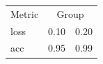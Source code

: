 \begin{tabular}{lcc}
Metric & \multicolumn{2}{c}{Group} \\
loss & 0.10 & 0.20 \\
acc & 0.95 & 0.99 \\
\end{tabular}
